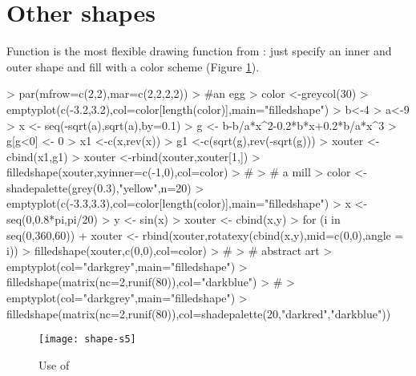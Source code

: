 \documentclass[article,nojss]{jss}
\begin{document}
\section{Other shapes}
Function  is the most flexible drawing function from : just specify an inner and outer shape and
fill with a color scheme (Figure \ref{fig:s5}).
\begin{Schunk}
\begin{Sinput}
> par(mfrow=c(2,2),mar=c(2,2,2,2))
> #an egg
> color <-greycol(30)
> emptyplot(c(-3.2,3.2),col=color[length(color)],main="filledshape")
> b<-4
> a<-9
> x      <- seq(-sqrt(a),sqrt(a),by=0.1)
> g      <- b-b/a*x^2-0.2*b*x+0.2*b/a*x^3
> g[g<0] <- 0
> x1     <-c(x,rev(x))
> g1     <-c(sqrt(g),rev(-sqrt(g)))
> xouter <-cbind(x1,g1)
> xouter <-rbind(xouter,xouter[1,])
> filledshape(xouter,xyinner=c(-1,0),col=color)
> #
> # a mill
> color <-shadepalette(grey(0.3),"yellow",n=20)
> emptyplot(c(-3.3,3.3),col=color[length(color)],main="filledshape")
> x <- seq(0,0.8*pi,pi/20)
> y <- sin(x)
> xouter <- cbind(x,y)
> for (i in seq(0,360,60))
+      xouter <- rbind(xouter,rotatexy(cbind(x,y),mid=c(0,0),angle = i))
> filledshape(xouter,c(0,0),col=color)
> #
> # abstract art
> emptyplot(col="darkgrey",main="filledshape")
> filledshape(matrix(nc=2,runif(80)),col="darkblue")
> #
> emptyplot(col="darkgrey",main="filledshape")
> filledshape(matrix(nc=2,runif(80)),col=shadepalette(20,"darkred","darkblue"))
\end{Sinput}
\end{Schunk}
\begin{figure}
\begin{center}
\texttt{[image: shape-s5]}
\end{center}
\caption{Use of }
\label{fig:s5}
\end{figure}
\end{document}
